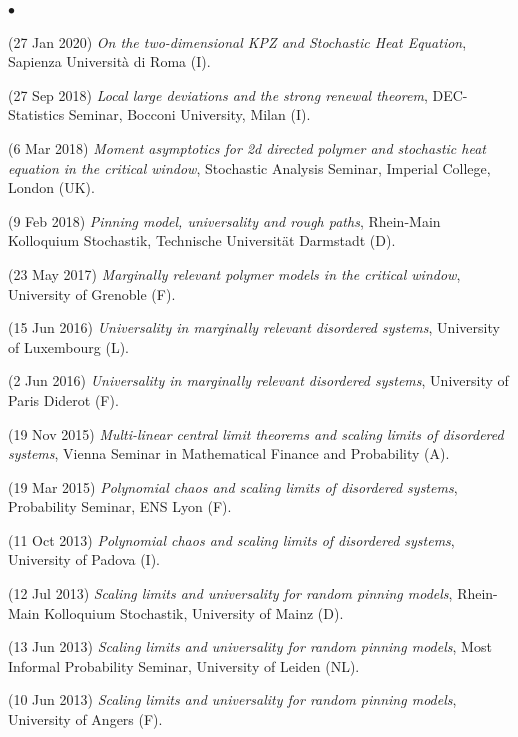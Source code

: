 \documentclass[a4paper,11pt,oneside]{amsart}
\newenvironment{myitemize}{%
\begin{list}{$\bullet$}%
 	{%
	\setlength{\itemsep}{0.3em}%
	\setlength{\topsep}{0.3em}%
	\setlength{\partopsep}{0em}%
	\setlength{\parsep}{0em}%
	\setlength{\parskip}{0em}%
	\setlength\leftmargin{1.5em}%
	\setlength\labelwidth{1.1em}%
	\setlength{\labelsep}{0.4em}%
	}%
	}%
{\end{list}}
\renewenvironment{itemize}{
\begin{myitemize}}%
{\end{myitemize}}
\begin{document}
\begin{itemize}
\item (27 Jan 2020)
\emph{On the two-dimensional KPZ and Stochastic Heat Equation},
Sapienza Universit\`a di Roma (I).

\item (27 Sep 2018)
\emph{Local large deviations and the strong renewal theorem},
DEC-Statistics Seminar, Bocconi University, Milan (I).

\item (6 Mar 2018)
\emph{Moment asymptotics for 2d directed polymer and stochastic 
heat equation in the critical window},
Stochastic Analysis Seminar, Imperial College, London (UK).

\item (9 Feb 2018)
\emph{Pinning model, universality and rough paths},
Rhein-Main Kolloquium Stochastik, Technische Universit\"at Darmstadt (D).

\item (23 May 2017)
\emph{Marginally relevant polymer models in the critical window},
University of Grenoble (F).

\item (15 Jun 2016)
\emph{Universality in marginally relevant disordered systems},
University of Luxembourg (L).

\item (2 Jun 2016)
\emph{Universality in marginally relevant disordered systems},
University of Paris Diderot (F).

\item (19 Nov 2015)
\emph{Multi-linear central limit theorems and scaling limits of disordered systems},
Vienna Seminar in Mathematical Finance and Probability (A).

\item (19 Mar 2015)
\emph{Polynomial chaos and scaling limits of disordered systems},
Probability Seminar, ENS Lyon (F).

\item (11 Oct 2013)
\emph{Polynomial chaos and scaling limits of disordered systems},
University of Padova (I).

\item (12 Jul 2013)
\emph{Scaling limits and universality for random pinning models},
Rhein-Main Kolloquium Stochastik, University of Mainz (D).

\item (13 Jun 2013)
\emph{Scaling limits and universality for random pinning models},
Most Informal Probability Seminar, University of Leiden (NL).

\item (10 Jun 2013)
\emph{Scaling limits and universality for random pinning models},
University of Angers (F).


\end{itemize}
\end{document}
